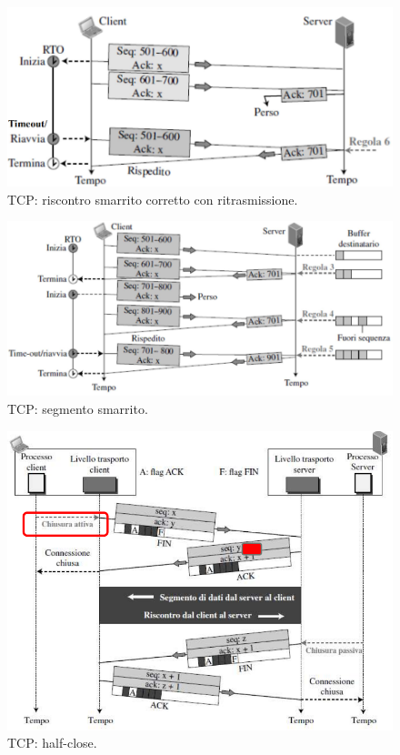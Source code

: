 \documentclass[11pt, italian, openany]{book}
\begin{document}
\begin{sloppypar}
\begin{figure}[!h]
	\centering
	\includegraphics[scale=0.4]{images/tcp-riscontro-smarrito-ritrasmissione.png}
	\caption{TCP: riscontro smarrito corretto con ritrasmissione.}
	\label{fig:tcp-riscontro-smarrito-ritrasmissione}
\end{figure}

\pagebreak

\begin{figure}[!h]
	\centering
	\includegraphics[scale=0.45]{images/tcp-segmento-smarrito.png}
	\caption{TCP: segmento smarrito.}
	\label{fig:tcp-segmento-smarrito}
\end{figure}

\begin{figure}[!h]
	\centering
	\includegraphics[scale=0.5]{images/tcp-half-close.png}
	\caption{TCP: half-close.}
	\label{fig:tcp-half-close}
\end{figure}


\end{sloppypar}
\end{document}
